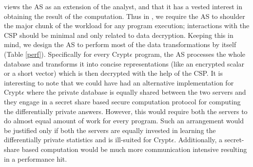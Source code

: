  \system views the \textsf{AS} as an extension of the analyst, and that it has a vested interest in obtaining the result of the computation.   Thus in \system, we require the \textsf{AS} to  shoulder the major chunk of the workload for any \system program execution; interactions with the \textsf{CSP} should be minimal and only related to data decryption.
Keeping this in  mind, we design the \textsf{AS} to perform most of the data transformations by itself (Table \ref{perf}). Specifically for every Crypt$\epsilon$ program, the \textsf{AS} processes the whole database and transforms it into concise representations (like an encrypted scalar or a short vector) which is then decrypted with the help of the \textsf{CSP}. It is interesting to note that we could have had an alternative implementation for Crypt$\epsilon$ where the private database is equally shared between the two servers and they engage in a secret share based secure computation protocol for computing the differentially private answers. However, this would require both the servers to do almost equal amount of work for every program. Such an arrangement would be justified only if both the servers are equally invested in learning the differentially private statistics and is ill-suited for Crypt$\epsilon$. Additionally, a secret-share based computation would be much more communication intensive resulting in a performance hit. 



